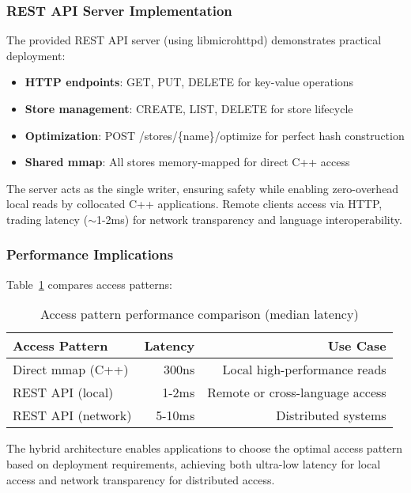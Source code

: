\documentclass[10pt,conference]{IEEEtran}
\begin{document}
\subsubsection{REST API Server Implementation}

The provided REST API server (using libmicrohttpd) demonstrates practical deployment:

\begin{itemize}
\item \textbf{HTTP endpoints}: GET, PUT, DELETE for key-value operations
\item \textbf{Store management}: CREATE, LIST, DELETE for store lifecycle
\item \textbf{Optimization}: POST /stores/\{name\}/optimize for perfect hash construction
\item \textbf{Shared mmap}: All stores memory-mapped for direct C++ access
\end{itemize}

The server acts as the single writer, ensuring safety while enabling zero-overhead local reads by collocated C++ applications. Remote clients access via HTTP, trading latency ($\sim$1-2ms) for network transparency and language interoperability.

\subsubsection{Performance Implications}

Table~\ref{tab:ipc-performance} compares access patterns:

\begin{table}[htbp]
\centering
\caption{Access pattern performance comparison (median latency)}
\label{tab:ipc-performance}
\begin{tabular}{lrr}
\toprule
Access Pattern & Latency & Use Case \\
\midrule
Direct mmap (C++) & 300ns & Local high-performance reads \\
REST API (local) & 1-2ms & Remote or cross-language access \\
REST API (network) & 5-10ms & Distributed systems \\
\bottomrule
\end{tabular}
\end{table}

The hybrid architecture enables applications to choose the optimal access pattern based on deployment requirements, achieving both ultra-low latency for local access and network transparency for distributed access.
\end{document}
